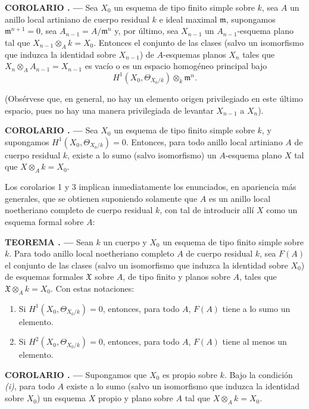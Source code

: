 \documentclass[11pt,twoside,openany]{book}
\numberwithin{equation}{section}
\newcommand{\src}[1]{%
  \phantomsection\hypertarget{src:#1}{}%
  \marginpar{\raggedleft\footnotesize\sffamily #1}%
}
\theoremstyle{plain}
\theoremstyle{definition}
\theoremstyle{remark}
\newcommand{\result}[2]{%
  \par\medskip\noindent\textbf{#1%
  \if\relax\detokenize{#2}\relax\else\space#2\fi. ---}\enspace
}
\newcommand{\FgaUnitKey}{frontmatter}
\renewcommand{\src}[1]{%
  \phantomsection\hypertarget{src:\FgaUnitKey:#1}{}%
  \marginpar{\raggedleft\footnotesize\sffamily #1}%
}
\theoremstyle{plain}
\theoremstyle{definition}
\theoremstyle{remark}
\begin{document}
\src{205}
\result{COROLARIO}{2} Sea $X_0$ un esquema de tipo finito simple sobre $k$, sea
$A$ un anillo local artiniano de cuerpo residual $k$ e ideal maximal
$\mathfrak m$, supongamos $\mathfrak m^{n+1}=0$, sea
$A_{n-1}=A/\mathfrak m^n$ y, por último, sea $X_{n-1}$ un
$A_{n-1}$-esquema plano tal que $X_{n-1}\otimes_A k=X_0$. Entonces el conjunto
de las clases (salvo un isomorfismo que induzca la identidad sobre $X_{n-1}$)
de $A$-esquemas planos $X_n$ tales que
$X_n\otimes_A A_{n-1}=X_{n-1}$ es vacío o es un espacio homogéneo principal
bajo
\[
  H^1(X_0,\Theta_{X_0/k})\otimes_k\mathfrak m^n.
\]

(Obsérvese que, en general, no hay un elemento origen privilegiado en este
último espacio, pues no hay una manera privilegiada de levantar $X_{n-1}$ a
$X_n$).

\result{COROLARIO}{3} Sea $X_0$ un esquema de tipo finito simple sobre $k$, y
supongamos $H^1(X_0,\Theta_{X_0/k})=0$. Entonces, para todo anillo local
artiniano $A$ de cuerpo residual $k$, existe a lo sumo (salvo isomorfismo) un
$A$-esquema plano $X$ tal que $X\otimes_A k=X_0$.

Los corolarios 1 y 3 implican inmediatamente los enunciados, en apariencia más
generales, que se obtienen suponiendo solamente que $A$ es un anillo local
noetheriano completo de cuerpo residual $k$, con tal de introducir allí $X$
como un esquema formal sobre $A$:

\result{TEOREMA}{9} Sean $k$ un cuerpo y $X_0$ un esquema de tipo finito simple
sobre $k$. Para todo anillo local noetheriano completo $A$ de cuerpo residual
$k$, sea $F(A)$ el conjunto de las clases (salvo un isomorfismo que induzca la
identidad sobre $X_0$) de esquemas formales $\mathfrak X$ sobre $A$, de tipo
finito y planos sobre $A$, tales que $\mathfrak X\otimes_A k=X_0$. Con estas
notaciones:
\begin{enumerate}
  \item[\textit{i.}] Si $H^1(X_0,\Theta_{X_0/k})=0$, entonces, para todo $A$,
    $F(A)$ tiene a lo sumo un elemento.
  \item[\textit{ii.}] Si $H^2(X_0,\Theta_{X_0/k})=0$, entonces, para todo $A$,
    $F(A)$ tiene al menos un elemento.
\end{enumerate}

\src{206}
\result{COROLARIO}{1} Supongamos que $X_0$ es propio sobre $k$. Bajo la
condición \textit{(i)}, para todo $A$ existe a lo sumo (salvo un isomorfismo que
induzca la identidad sobre $X_0$) un esquema $X$ propio y plano sobre $A$ tal
que $X\otimes_A k=X_0$.
\end{document}
